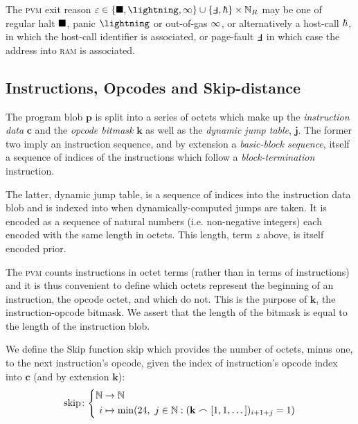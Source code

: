 The \textsc{pvm} exit reason $\varepsilon \in \{\halt, \panic, \oog\} \cup \{\fault, \host\} \times \N_R$ may be one of regular halt $\blacksquare$, panic $\panic$ or out-of-gas $\infty$, or alternatively a host-call $\hbar$, in which the host-call identifier is associated, or page-fault $\fault$ in which case the address into \textsc{ram} is associated.

\subsection{Instructions, Opcodes and Skip-distance}

The program blob $\mathbf{p}$ is split into a series of octets which make up the \emph{instruction data} $\mathbf{c}$ and the \emph{opcode bitmask} $\mathbf{k}$ as well as the \emph{dynamic jump table}, $\mathbf{j}$. The former two imply an instruction sequence, and by extension a \emph{basic-block sequence}, itself a sequence of indices of the instructions which follow a \emph{block-termination} instruction.

The latter, dynamic jump table, is a sequence of indices into the instruction data blob and is indexed into when dynamically-computed jumps are taken. It is encoded as a sequence of natural numbers (i.e. non-negative integers) each encoded with the same length in octets. This length, term $z$ above, is itself encoded prior.

The \textsc{pvm} counts instructions in octet terms (rather than in terms of instructions) and it is thus convenient to define which octets represent the beginning of an instruction, \ie the opcode octet, and which do not. This is the purpose of $\mathbf{k}$, the instruction-opcode bitmask. We assert that the length of the bitmask is equal to the length of the instruction blob.

\newcommand{\Fskip}{\text{skip}}

We define the Skip function $\Fskip$ which provides the number of octets, minus one, to the next instruction's opcode, given the index of instruction's opcode index into $\mathbf{c}$ (and by extension $\mathbf{k}$):
\begin{equation}
  \Fskip\colon\left\{\begin{aligned}
    \N &\to \N\\
    i &\mapsto \min(24,\ j \in \N : (\mathbf{k} \frown [1, 1, \dots])_{i + 1 + j} = 1)
  \end{aligned}\right.
\end{equation}

